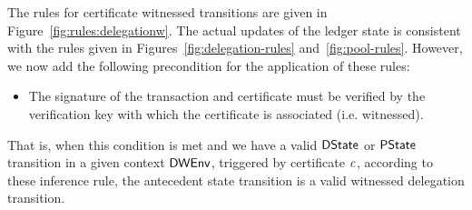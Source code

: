 The rules for certificate witnessed transitions are given in
Figure~\ref{fig:rules:delegationw}. The actual updates of the ledger state is
consistent with the rules given in Figures~\ref{fig:delegation-rules}
and~\ref{fig:pool-rules}. However, we now add the following precondition for the
application of these rules:

\begin{itemize}
\item The signature of the transaction and certificate must be verified by the
  verification key with which the certificate is associated (i.e. witnessed).
\end{itemize}

That is, when this condition is met and we have a valid $\mathsf{DState}$ or $\mathsf{PState}$
transition in a given context $\mathsf{DWEnv}$, triggered by certificate $\mathit{c}$,
according to these inference rule, the antecedent state transition is a
valid witnessed delegation transition.


